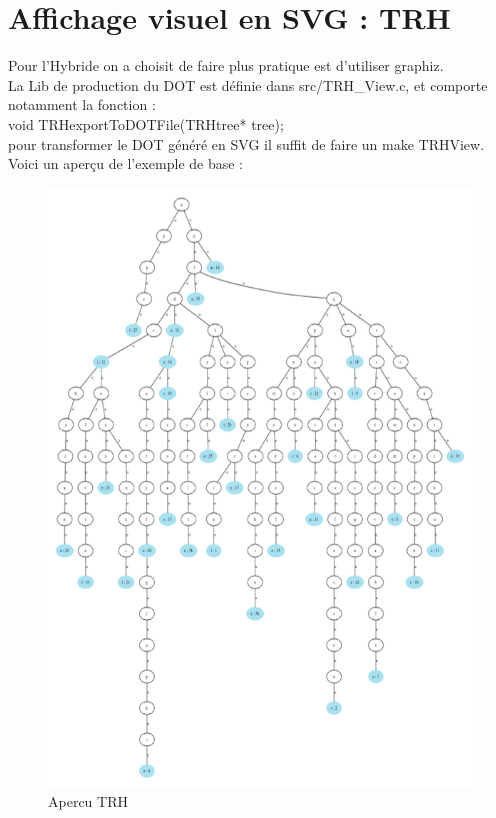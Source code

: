 \documentclass[a4paper,8pt]{report}
\begin{document}
\section*{Affichage visuel en SVG : TRH}\label{sec:name}
Pour l'Hybride on a choisit de faire plus pratique est d'utiliser graphiz.\\
La Lib de production du DOT est définie dans src/TRH\_View.c, et comporte notamment la fonction : \\
void TRHexportToDOTFile(TRHtree* tree);\\
pour transformer le DOT généré en SVG il suffit de faire un make TRHView.\\
Voici un aperçu de l'exemple de base :\\
\begin{figure}[H]
  \centering
  \includegraphics[width=1.0\textwidth]{TRH.png}
  \caption{Apercu TRH}
  \label{fig:Aprecu TRH}
\end{figure}
\end{document}
